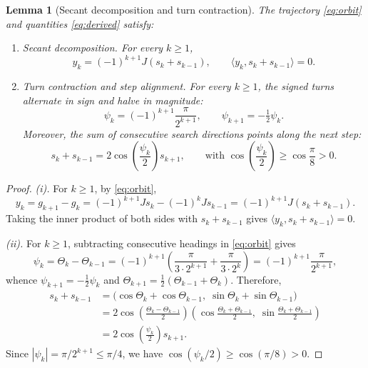 \documentclass[11pt]{article}
\newtheorem{lemma}[theorem]{Lemma}
\newcommand{\ip}[2]{\langle #1,#2\rangle}
\begin{document}
\begin{lemma}[Secant decomposition and turn contraction]
\label{lem:angles}
The trajectory \eqref{eq:orbit} and quantities \eqref{eq:derived} satisfy:
\begin{enumerate}
\item[(i)] \emph{Secant decomposition.} For every $k \ge 1$,
\begin{equation}
\label{eq:yk-geom}
y_k = (-1)^{k+1}J(s_k + s_{k-1}), \qquad \ip{y_k}{s_k + s_{k-1}} = 0.
\end{equation}
\item[(ii)] \emph{Turn contraction and step alignment.} For every $k \ge 1$, the signed turns alternate in sign and halve in magnitude:
\begin{equation}
\label{eq:turns}
\psi_k = (-1)^{k+1}\frac{\pi}{2^{k+1}}, \qquad \psi_{k+1} = -\tfrac12\psi_k.
\end{equation}
Moreover, the sum of consecutive search directions points along the next step:
\begin{equation}
\label{eq:bisect-vec}
s_k + s_{k-1} = 2\cos\left(\frac{\psi_k}{2}\right) s_{k+1}, \qquad \text{with } \cos\left(\frac{\psi_k}{2}\right) \ge \cos\frac{\pi}{8} > 0.
\end{equation}
\end{enumerate}
\end{lemma}

\begin{proof}
\emph{(i).} For $k \ge 1$, by \eqref{eq:orbit},
\[
y_k = g_{k+1} - g_k = (-1)^{k+1}Js_k - (-1)^kJs_{k-1} = (-1)^{k+1}J(s_k + s_{k-1}).
\]
Taking the inner product of both sides with $s_k + s_{k-1}$ gives $\ip{y_k}{s_k + s_{k-1}} = 0$.

\emph{(ii).} For $k \ge 1$, subtracting consecutive headings in \eqref{eq:orbit} gives
\[
\psi_k = \Theta_k - \Theta_{k-1} = (-1)^{k+1}\left(\frac{\pi}{3 \cdot 2^{k+1}} + \frac{\pi}{3 \cdot 2^k}\right) = (-1)^{k+1}\frac{\pi}{2^{k+1}},
\]
whence $\psi_{k+1} = -\tfrac12\psi_k$ and $\Theta_{k+1} = \frac12(\Theta_{k-1} + \Theta_k)$.
Therefore,
\begin{align*}
s_k + s_{k-1}
&= \bigl(\cos\Theta_k + \cos\Theta_{k-1},\; \sin\Theta_k + \sin\Theta_{k-1}\bigr)\\
&= 2\cos\left(\frac{\Theta_k - \Theta_{k-1}}{2}\right)\left(\cos\frac{\Theta_k + \Theta_{k-1}}{2},\; \sin\frac{\Theta_k + \Theta_{k-1}}{2}\right)\\
&= 2\cos\left(\frac{\psi_k}{2}\right) s_{k+1}.
\end{align*}
Since $|\psi_k| = \pi/2^{k+1} \le \pi/4$, we have $\cos(\psi_k/2) \ge \cos(\pi/8) > 0$.
\end{proof}
\end{document}
